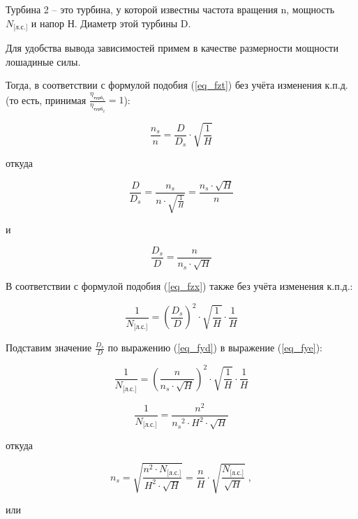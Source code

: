 \vspace{0.5cm}

Турбина 2 -- это турбина, у которой известны частота вращения n, мощность $N_{\text{[л.с.]}}$ и напор Н. Диаметр этой турбины D.

\vspace{0.5cm}

Для удобства вывода зависимостей примем в качестве размерности мощности лошадиные силы.

Тогда, в соответствии с формулой подобия (\ref{eq_fzt}) без учёта изменения к.п.д. (то есть, принимая $\frac{\eta_{\text{турб}_1}} {\eta_{\text{турб}_2}} = 1$):

\begin{equation}
\label{eq_fyc}
  \frac{n_s}{n} = \frac{D}{D_s} \cdot \sqrt{\frac{1}{H}} 
\end{equation}

откуда

$$
  \frac{D}{D_s} = \frac{n_s}{n \cdot \sqrt{\frac{1}{H}}} = \frac{n_s \cdot \sqrt{H}}{n}
$$

и

\begin{equation}
\label{eq_fyd}
  \frac{D_s}{D} = \frac{n}{n_s \cdot \sqrt{H}}
\end{equation}

\vspace{0.5cm}

В соответствии с формулой подобия (\ref{eq_fzx}) также без учёта изменения к.п.д.:


\begin{equation}
\label{eq_fye}
   \frac{1}{N_{\text{[л.с.]}}} = \left( \frac{D_s}{D} \right)^2 \cdot \sqrt{\frac{1}{H}} \cdot \frac{1}{H} 
\end{equation}

 

Подставим значение $\frac{D_s}{D}$ по выражению (\ref{eq_fyd}) в выражение (\ref{eq_fye}):

$$
  \frac{1}{N_{\text{[л.с.]}}} = \left( \frac{n}{n_s \cdot \sqrt{H}} \right)^2 \cdot \sqrt{\frac{1}{H}} \cdot \frac{1}{H} 
$$

$$
  \frac{1}{N_{\text{[л.с.]}}} = \frac{n^2}{{n_s}^2 \cdot H^2 \cdot \sqrt{H}}
$$

откуда 

$$
  n_s = \sqrt{\frac{n^2 \cdot N_{\text{[л.с.]}}}{H^2 \cdot \sqrt{H}}} = \frac{n}{H} \cdot \sqrt{\frac{N_{\text{[л.с.]}}}{\sqrt{H}}} \; ,
$$

или



